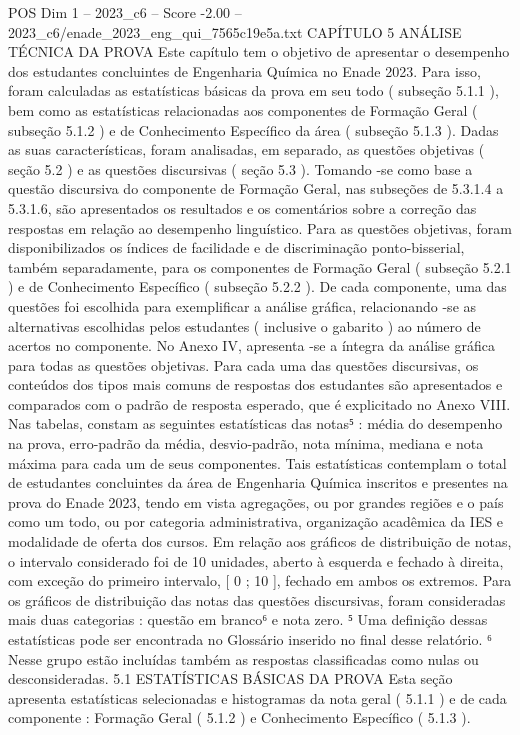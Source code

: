 \begin{textsample}{POS Dim 1 – 2023\_c6 – Score -2.00 – 2023\_c6/enade\_2023\_eng\_qui\_7565c19e5a.txt}  \label{ex:f1_pos_236}
CAPÍTULO 5 ANÁLISE TÉCNICA DA PROVA Este capítulo tem o objetivo de apresentar o desempenho dos estudantes concluintes de Engenharia Química no Enade 2023.
Para isso, foram calculadas as estatísticas básicas da prova em seu todo ( subseção 5.1.1 ), bem como as estatísticas relacionadas aos componentes de Formação Geral ( subseção 5.1.2 ) e de Conhecimento Específico da área ( subseção 5.1.3 ).
Dadas as suas características, foram analisadas, em separado, as questões objetivas ( seção 5.2 ) e as questões discursivas ( seção 5.3 ).
Tomando -se como base a questão discursiva do componente de Formação Geral, nas subseções de 5.3.1.4 a 5.3.1.6, são apresentados os resultados e os comentários sobre a correção das respostas em relação ao desempenho linguístico.
Para as questões objetivas, foram disponibilizados os índices de facilidade e de discriminação ponto-bisserial, também separadamente, para os componentes de Formação Geral ( subseção 5.2.1 ) e de Conhecimento Específico ( subseção 5.2.2 ).
De cada componente, uma das questões foi escolhida para exemplificar a análise gráfica, relacionando -se as alternativas escolhidas pelos estudantes ( inclusive o gabarito ) ao número de acertos no componente.
No Anexo IV, apresenta -se a íntegra da análise gráfica para todas as questões objetivas.
Para cada uma das questões discursivas, os conteúdos dos tipos mais comuns de respostas dos estudantes são apresentados e comparados com o padrão de resposta esperado, que é explicitado no Anexo VIII.
Nas tabelas, constam as seguintes estatísticas das notas⁵ : média do desempenho na prova, erro-padrão da média, desvio-padrão, nota mínima, mediana e nota máxima para cada um de seus componentes.
Tais estatísticas contemplam o total de estudantes concluintes da área de Engenharia Química inscritos e presentes na prova do Enade 2023, tendo em vista agregações, ou por grandes regiões e o país como um todo, ou por categoria administrativa, organização acadêmica da IES e modalidade de oferta dos cursos.
Em relação aos gráficos de distribuição de notas, o intervalo considerado foi de 10 unidades, aberto à esquerda e fechado à direita, com exceção do primeiro intervalo, [ 0 ; 10 ], fechado em ambos os extremos.
Para os gráficos de distribuição das notas das questões discursivas, foram consideradas mais duas categorias : questão em branco⁶ e nota zero. ⁵ Uma definição dessas estatísticas pode ser encontrada no Glossário inserido no final desse relatório. ⁶ Nesse grupo estão incluídas também as respostas classificadas como nulas ou desconsideradas. 5.1 ESTATÍSTICAS BÁSICAS DA PROVA Esta seção apresenta estatísticas selecionadas e histogramas da nota geral ( 5.1.1 ) e de cada componente : Formação Geral ( 5.1.2 ) e Conhecimento Específico ( 5.1.3 ).

\end{textsample}
